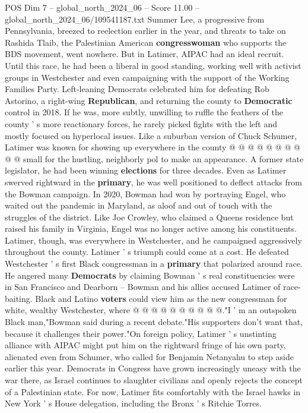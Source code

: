 \begin{textsample}{POS Dim 7 – global\_north\_2024\_06 – Score 11.00 – global\_north\_2024\_06/109541187.txt}
Summer Lee, a progressive from Pennsylvania, breezed to reelection earlier in the year, and threats to take on Rashida Tlaib, the Palestinian American \textbf{congresswoman} who supports the BDS movement, went nowhere.
But in Latimer, AIPAC had an ideal recruit.
Until this race, he had been a liberal in good standing, working well with activist groups in Westchester and even campaigning with the support of the Working Families Party.
Left-leaning Democrats celebrated him for defeating Rob Astorino, a right-wing \textbf{Republican}, and returning the county to \textbf{Democratic} control in 2018.
If he was, more subtly, unwilling to ruffle the feathers of the county ' s more reactionary forces, he rarely picked fights with the left and mostly focused on hyperlocal issues.
Like a suburban version of Chuck Schumer, Latimer was known for showing up everywhere in the county @ @ @ @ @ @ @ @ @ @ small for the hustling, neighborly pol to make an appearance.
A former state legislator, he had been winning \textbf{elections} for three decades.
Even as Latimer swerved rightward in the \textbf{primary}, he was well positioned to deflect attacks from the Bowman campaign.
In 2020, Bowman had won by portraying Engel, who waited out the pandemic in Maryland, as aloof and out of touch with the struggles of the district.
Like Joe Crowley, who claimed a Queens residence but raised his family in Virginia, Engel was no longer active among his constituents.
Latimer, though, was everywhere in Westchester, and he campaigned aggressively throughout the county.
Latimer ' s triumph could come at a cost.
He defeated Westchester ' s first Black congressman in a \textbf{primary} that polarized around race.
He angered many \textbf{Democrats} by claiming Bowman ' s real constituencies were in San Francisco and Dearborn -- Bowman and his allies accused Latimer of race-baiting.
Black and Latino \textbf{voters} could view him as the new congressman for white, wealthy Westchester, where @ @ @ @ @ @ @ @ @ @."I ' m an outspoken Black man,"Bowman said during a recent debate."His supporters don't want that, because it challenges their power."On foreign policy, Latimer ' s unstinting alliance with AIPAC might put him on the rightward fringe of his own party, alienated even from Schumer, who called for Benjamin Netanyahu to step aside earlier this year.
Democrats in Congress have grown increasingly uneasy with the war there, as Israel continues to slaughter civilians and openly rejects the concept of a Palestinian state.
For now, Latimer fits comfortably with the Israel hawks in New York ' s House delegation, including the Bronx ' s Ritchie Torres.

\end{textsample}
